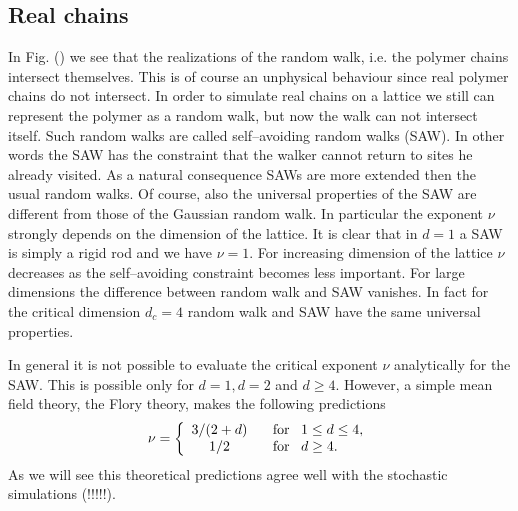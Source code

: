 \subsection{Real chains}
In Fig. () we see that the realizations of the random walk, i.e. 
the polymer chains intersect themselves. This is of course an 
unphysical behaviour since real polymer chains do not intersect.
In order to simulate real chains on a lattice we still can 
represent  the polymer as a random walk, but now the walk can not 
intersect itself. Such random walks are called self--avoiding 
random walks (SAW). In other words the SAW has the constraint that 
the walker cannot return to sites he already visited. As a natural 
consequence SAWs are more extended then the usual random walks. Of 
course, also the universal properties of the SAW are different 
from those of the Gaussian random walk. In particular the exponent
$\nu$ strongly depends on the dimension of the lattice. It is 
clear that in $d=1$ a SAW is simply a rigid rod and we have 
$\nu=1$. For increasing dimension of the lattice $\nu$ 
decreases as the self--avoiding constraint becomes less important. 
For large dimensions the difference between random walk and SAW 
vanishes. In fact for the critical dimension $d_c =4$ random walk 
and SAW have the same universal properties. 

In general it is not 
possible to evaluate the critical exponent $\nu$ analytically for the 
SAW. This is possible only for $d=1,d=2$ and $d \ge4$. However, a 
simple mean field theory, the Flory theory, makes the following 
predictions
\begin{equation*}
\nu = \left\{ \begin{array}{cl}
               3/(2+d) & \;\;\; {\rm for} \;\;\; 1 \le d \le 4, \\
               1/2     & \;\;\; {\rm for} \;\;\; d\ge 4.
\end{array}
       \right.
\end{equation*}
As we will see this theoretical predictions agree well with the 
stochastic simulations (!!!!!).


